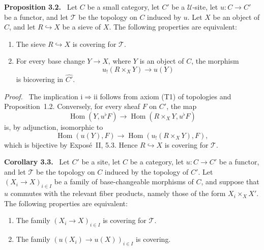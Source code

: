 \documentclass[11pt]{article}
\newcommand{\U}{\mathcal{U}}
\newcommand{\T}{\mathcal{T}}
\newcommand{\Hom}{\operatorname{Hom}}
\newenvironment{statement}[1]{\par\medskip\noindent\textbf{#1.}\ }{\par\medskip}
\newenvironment{prooftext}{\par\noindent\emph{Proof.}\ }{\par\medskip}
\begin{document}
\begin{statement}{Proposition 3.2}
Let \(C\) be a small category, let \(C'\) be a \(\U\)-site, let \(u:C\to C'\) be a functor, and let \(\T\) be the topology on \(C\) induced by \(u\). Let \(X\) be an object of \(C\), and let \(R\hookrightarrow X\) be a sieve of \(X\). The following properties are equivalent:
\begin{enumerate}[label=\roman*)]
\item The sieve \(R\hookrightarrow X\) is covering for \(\T\).
\item For every base change \(Y\to X\), where \(Y\) is an object of \(C\), the morphism
\[
u_!(R\times_XY)\to u(Y)
\]
is bicov\-ering in \(\widehat{C'}\).
\end{enumerate}
\end{statement}

\begin{prooftext}
The implication \(\mathrm{i}\Rightarrow\mathrm{ii}\) follows from axiom (T1) of topologies and Proposition~1.2. Conversely, for every sheaf \(F\) on \(C'\), the map
\[
\Hom(Y,u^\flat F)\to \Hom(R\times_XY,u^\flat F)
\]
is, by adjunction, isomorphic to
\[
\Hom(u(Y),F)\to\Hom(u_!(R\times_XY),F),
\]
which is bijective by Expos\'e~II, 5.3. Hence \(R\hookrightarrow X\) is covering for \(\T\).
\end{prooftext}

\begin{statement}{Corollary 3.3}
Let \(C'\) be a site, let \(C\) be a category, let \(u:C\to C'\) be a functor, and let \(\T\) be the topology on \(C\) induced by the topology of \(C'\). Let \((X_i\to X)_{i\in I}\) be a family of base-changeable morphisms of \(C\), and suppose that \(u\) commutes with the relevant fiber products, namely those of the form \(X_i\times_XX'\). The following properties are equivalent:
\begin{enumerate}[label=\roman*)]
\item The family \((X_i\to X)_{i\in I}\) is covering for \(\T\).
\item The family \((u(X_i)\to u(X))_{i\in I}\) is covering.
\end{enumerate}
\end{statement}
\end{document}
